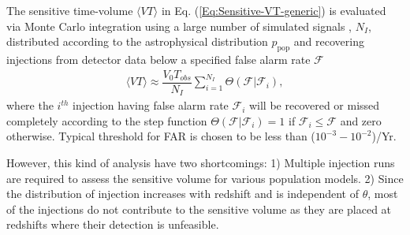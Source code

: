 The sensitive time-volume $\langle VT \rangle$ in Eq. (\ref{Eq:Sensitive-VT-generic}) is evaluated via Monte Carlo integration using a large number of simulated signals \cite{Tiwari:2017ndi}, $N_I$, distributed according to the astrophysical distribution $p_{\text{pop}}$ and recovering injections from detector data below a specified false alarm rate $\mathcal{F}$
\begin{align}
    \langle VT\rangle  \approx \dfrac{V_0T_{obs}}{N_I} \sum_{i=1}^{N_I} \Theta(\mathcal{F}|\mathcal{F}_i),
    \label{Eq:generic-MC-integral}
\end{align}
where the $i^{th}$ injection having false alarm rate $\mathcal{F}_i$ will be recovered or missed completely according to the step function $\Theta(\mathcal{F}|\mathcal{F}_i) = 1$ if $\mathcal{F}_i \leq \mathcal{F}$ and zero otherwise. Typical threshold for FAR is chosen to be less than ($10^{-3}-10^{-2}$)/Yr. 

However, this kind of analysis have two shortcomings: 1) Multiple injection runs are required to assess the sensitive volume for various population models. 2) Since the distribution of injection increases with redshift and is independent of $\theta$, most of the injections do not contribute to the sensitive volume as they are placed at redshifts where their detection is unfeasible. 

